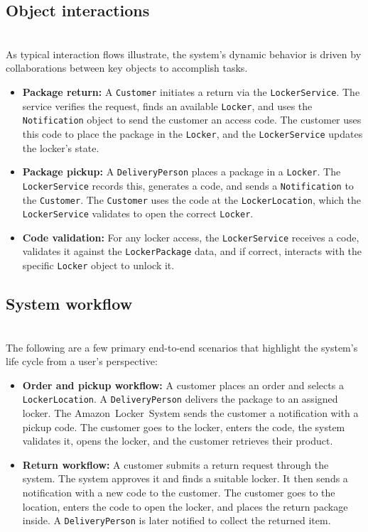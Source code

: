 \subsection{Object interactions}\label{CmW5Tvoj7X-0tz_gKuy88}
\\
As typical interaction flows illustrate, the system's dynamic behavior is driven by collaborations between key objects to accomplish tasks.

\begin{itemize}
\item
\protect{}\label{nPrta1THn6u-4xm3fz0TV}
\textbf{Package return:} A \texttt{Customer} initiates a return via the \texttt{LockerService}. The service verifies the request, finds an available \texttt{Locker}, and uses the \texttt{Notification} object to send the customer an access code. The customer uses this code to place the package in the \texttt{Locker}, and the \texttt{LockerService} updates the locker's state.
\item
\protect{}\label{0MOdk7XDTasdi3o8PH0H1}
\textbf{Package pickup:} A \texttt{DeliveryPerson} places a package in a \texttt{Locker}. The \texttt{LockerService} records this, generates a code, and sends a \texttt{Notification} to the \texttt{Customer}. The \texttt{Customer} uses the code at the \texttt{LockerLocation}, which the \texttt{LockerService} validates to open the correct \texttt{Locker}.
\item
\protect{}\label{VOZyfwSv4PmMO4p2vVrpR}
\textbf{Code validation:} For any locker access, the \texttt{LockerService} receives a code, validates it against the \texttt{LockerPackage} data, and if correct, interacts with the specific \texttt{Locker} object to unlock it.
\end{itemize}

\subsection{System workflow}\label{NlApekhQz-kA9cvPxNvHz}
\\
The following are a few primary end-to-end scenarios that highlight the system's life cycle from a user's perspective:

\begin{itemize}
\item
\protect{}\label{p_YXYOZvRrxM0FyZPYqae}
\textbf{Order and pickup workflow:} A customer places an order and selects a \texttt{LockerLocation}. A \texttt{DeliveryPerson} delivers the package to an assigned locker. The Amazon\ Locker\ System sends the customer a notification with a pickup code. The customer goes to the locker, enters the code, the system validates it, opens the locker, and the customer retrieves their product.
\item
\protect{}\label{piPgknuyZtNZ5yo6goqKj}
\textbf{Return workflow:} A customer submits a return request through the system. The system approves it and finds a suitable locker. It then sends a notification with a new code to the customer. The customer goes to the location, enters the code to open the locker, and places the return package inside. A \texttt{DeliveryPerson} is later notified to collect the returned item.
\end{itemize}

